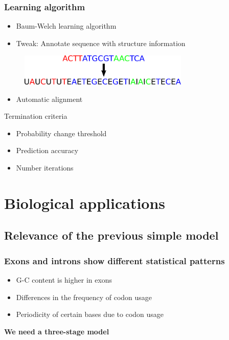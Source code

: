 \documentclass{beamer}[12pt]
\begin{document}
\begin{frame}
\frametitle{Learning algorithm}

	\begin{itemize}
		\item Baum-Welch learning algorithm
		\item Tweak: Annotate sequence with structure information
	\end{itemize}
	\begin{figure}
		\includegraphics[height=1.5cm]{../picturesforthepresentation/annotation.png}
	\end{figure}
	\begin{itemize}
		\item Automatic alignment
	\end{itemize}
	\begin{block}{Termination criteria}
		\begin{itemize}
			\item Probability change threshold
			\item Prediction accuracy
			\item Number iterations
		\end{itemize}
	\end{block}
\end{frame}

\section{Biological applications}
\subsection{Relevance of the previous simple model}

\begin{frame}
\frametitle{Exons and introns show different statistical patterns}
\begin{itemize}
	\item G-C content is higher in exons
	\item Differences in the frequency of codon usage
	\item Periodicity of certain bases due to codon usage
\end{itemize}
		
	\vspace{0.5cm}
	
	\pause\begin{center}
		\textbf{We need a three-stage model }
	\end{center}
\end{frame}
\end{document}
